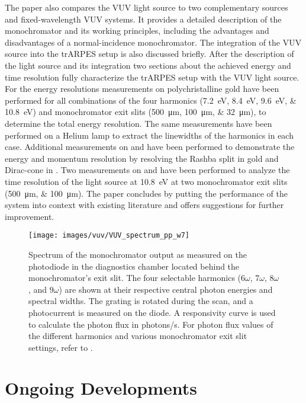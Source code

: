 The paper also compares the VUV light source to two complementary sources and fixed-wavelength VUV systems.
It provides a detailed description of the monochromator and its working principles, including the advantages and disadvantages of a normal-incidence monochromator.
The integration of the VUV source into the trARPES setup is also discussed briefly.
After the description of the light source and its integration two sections about the achieved energy and time resolution fully characterize the trARPES setup with the VUV light source.
For the energy resolutions measurements on polychristalline gold have been performed for all combinations of the four harmonics (\qtylist{7.2;8.4;9.6;10.8}{\electronvolt}) and monochromator exit slits (\qtylist{500;100;32}{\micro\meter}), to determine the total energy resolution.
The same measurements have been performed on a Helium lamp to extract the linewidths of the harmonics in each case.
Additional measurements on  and  have been performed to demonstrate the energy and momentum resolution by resolving the Rashba split in gold and Dirac-cone in .
Two measurements on  and  have been performed to analyze the time resolution of the light source at \qty{10.8}{\electronvolt} at two monochromator exit slits (\qtylist{500;100}{\micro\meter}).
The paper concludes by putting the performance of the system into context with existing literature and offers suggestions for further improvement.

\begin{figure}[h!]
	\centering
	\texttt{[image: images/vuv/VUV\_spectrum\_pp\_w7]}
	\caption{Spectrum of the monochromator output as measured on the photodiode in the diagnostics chamber located behind the monochromator’s exit slit. The four selectable harmonics ($6\omega$, $7\omega$, $8\omega$, and $9\omega$) are shown at their respective central photon energies and spectral widths. The grating is rotated during the scan, and a photocurrent is measured on the diode. A responsivity curve is used to calculate the photon flux in photons/s. For photon flux values of the different harmonics and various monochromator exit slit settings, refer to \cite{hellbruck_high-resolution_2024}.}
	\label{fig:vuv_spectrum}
\end{figure}



\section{Ongoing Developments}

